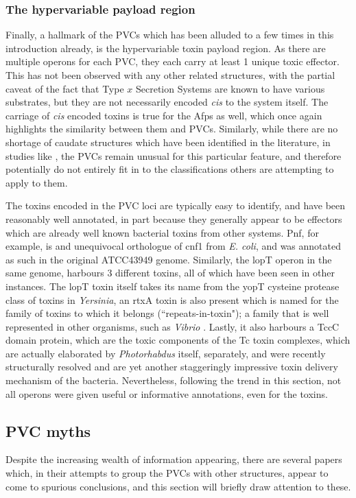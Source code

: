 \subsubsection{The hypervariable payload region}
Finally, a hallmark of the PVCs which has been alluded to a few times in this introduction already, is the hypervariable toxin payload region. As there are multiple operons for each PVC, they each carry at least 1 unique toxic effector. This has not been observed with any other related structures, with the partial caveat of the fact that Type $x$ Secretion Systems are known to have various substrates, but they are not necessarily encoded \emph{cis} to the system itself. The carriage of \emph{cis} encoded toxins is true for the Afps as well, which once again highlights the similarity between them and PVCs. Similarly, while there are no shortage of caudate structures which have been identified in the literature, in studies like \cite{Sarris2014}, the PVCs remain unusual for this particular feature, and therefore potentially do not entirely fit in to the classifications others are attempting to apply to them.

The toxins encoded in the PVC loci are typically easy to identify, and have been reasonably well annotated, in part because they generally appear to be effectors which are already well known bacterial toxins from other systems. Pnf, for example, is and unequivocal orthologue of cnf1 from \emph{E. coli}, and was annotated as such in the original ATCC43949 genome. Similarly, the lopT operon in the same genome, harbours 3 different toxins, all of which have been seen in other instances. The lopT toxin itself takes its name from the yopT cysteine protease class of toxins in \emph{Yersinia}, an rtxA toxin is also present which is named for the family of toxins to which it belongs (``repeats-in-toxin"); a family that is well represented in other organisms, such as \emph{Vibrio} \citep{Lin1999}. Lastly, it also harbours a TccC domain protein, which are the toxic components of the Tc toxin complexes, which are actually elaborated by \emph{Photorhabdus} itself, separately, and were recently structurally resolved \citep{Bowen1998, Meusch2014} and are yet another staggeringly impressive toxin delivery mechanism of the bacteria. Nevertheless, following the trend in this section, not all operons were given useful or informative annotations, even for the toxins.


\subsection{PVC myths}
Despite the increasing wealth of information appearing, there are several papers which, in their attempts to group the PVCs with other structures, appear to come to spurious conclusions, and this section will briefly draw attention to these.

